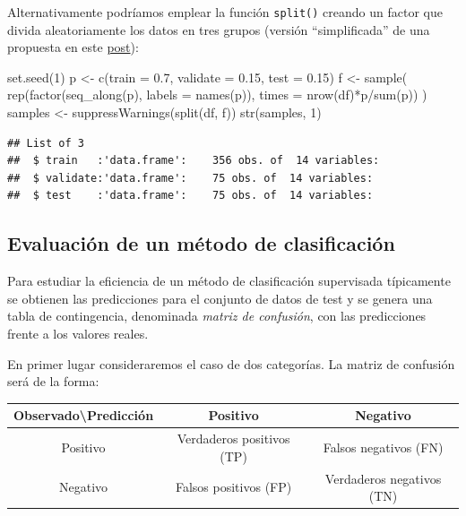 \documentclass[
  spanish,
]{book}
\newenvironment{Shaded}{\begin{snugshade}}{\end{snugshade}}
\newcommand{\AttributeTok}[1]{\textcolor[rgb]{0.77,0.63,0.00}{#1}}
\newcommand{\DecValTok}[1]{\textcolor[rgb]{0.00,0.00,0.81}{#1}}
\newcommand{\FloatTok}[1]{\textcolor[rgb]{0.00,0.00,0.81}{#1}}
\newcommand{\FunctionTok}[1]{\textcolor[rgb]{0.00,0.00,0.00}{#1}}
\newcommand{\NormalTok}[1]{#1}
\newcommand{\OtherTok}[1]{\textcolor[rgb]{0.56,0.35,0.01}{#1}}
\newcommand{\SpecialCharTok}[1]{\textcolor[rgb]{0.00,0.00,0.00}{#1}}
\theoremstyle{break}
\theoremstyle{definition}
\theoremstyle{definition}
\theoremstyle{definition}
\theoremstyle{definition}
\theoremstyle{remark}
\begin{document}
Alternativamente podríamos emplear la función \texttt{split()} creando un factor que divida aleatoriamente los datos en tres grupos (versión ``simplificada'' de una propuesta en este \href{https://stackoverflow.com/questions/36068963/r-how-to-split-a-data-frame-into-training-validation-and-test-sets}{post}):

\begin{Shaded}
\begin{Highlighting}[]
\FunctionTok{set.seed}\NormalTok{(}\DecValTok{1}\NormalTok{)}
\NormalTok{p }\OtherTok{\textless{}{-}} \FunctionTok{c}\NormalTok{(}\AttributeTok{train =} \FloatTok{0.7}\NormalTok{, }\AttributeTok{validate =} \FloatTok{0.15}\NormalTok{, }\AttributeTok{test =} \FloatTok{0.15}\NormalTok{)}
\NormalTok{f }\OtherTok{\textless{}{-}} \FunctionTok{sample}\NormalTok{( }\FunctionTok{rep}\NormalTok{(}\FunctionTok{factor}\NormalTok{(}\FunctionTok{seq\_along}\NormalTok{(p), }\AttributeTok{labels =} \FunctionTok{names}\NormalTok{(p)),}
                 \AttributeTok{times =} \FunctionTok{nrow}\NormalTok{(df)}\SpecialCharTok{*}\NormalTok{p}\SpecialCharTok{/}\FunctionTok{sum}\NormalTok{(p)) )}
\NormalTok{samples }\OtherTok{\textless{}{-}} \FunctionTok{suppressWarnings}\NormalTok{(}\FunctionTok{split}\NormalTok{(df, f))}
\FunctionTok{str}\NormalTok{(samples, }\DecValTok{1}\NormalTok{)}
\end{Highlighting}
\end{Shaded}

\begin{verbatim}
## List of 3
##  $ train   :'data.frame':    356 obs. of  14 variables:
##  $ validate:'data.frame':    75 obs. of  14 variables:
##  $ test    :'data.frame':    75 obs. of  14 variables:
\end{verbatim}

\hypertarget{eval-class}{%
\subsection{Evaluación de un método de clasificación}\label{eval-class}}

Para estudiar la eficiencia de un método de clasificación supervisada típicamente se obtienen las predicciones para el conjunto de datos de test y se genera una tabla de contingencia, denominada \emph{matriz de confusión}, con las predicciones frente a los valores reales.

En primer lugar consideraremos el caso de dos categorías.
La matriz de confusión será de la forma:

\begin{longtable}[]{@{}ccc@{}}
\toprule
Observado\textbackslash Predicción & Positivo & Negativo \\
\midrule
\endhead
Positivo & Verdaderos positivos (TP) & Falsos negativos (FN) \\
Negativo & Falsos positivos (FP) & Verdaderos negativos (TN) \\
\bottomrule
\end{longtable}
\end{document}
